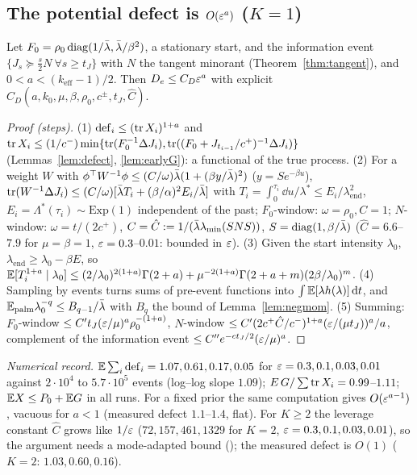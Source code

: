\subsection{The potential defect is $O(\varepsilon^a)$ ($K=1$)}\label{sec:eps-defect}

\begin{proposition}[early-phase defect, $K=1$, $k_0>1$, scaled prior]\label{prop:Dearly}\Ps{}
Let $F_0=\rho_0\operatorname{diag}(1/\bar\lambda,\bar\lambda/\beta^2)$, a stationary start, and the information event $\{J_s\succeq\tfrac s2N\ \forall s\ge t_J\}$ with $N$ the tangent minorant (Theorem~\ref{thm:tangent}), and $0<a<(k_{\mathrm{eff}}-1)/2$. Then $D_e\le C_D\varepsilon^a$ with explicit $C_D(a,k_0,\mu,\beta,\rho_0,c^\pm,t_J,\hat C)$.
\end{proposition}
\begin{proof}[Proof (steps)]
(1) $\mathrm{def}_i\le(\operatorname{tr} X_i)^{1+a}$ and $\operatorname{tr} X_i\le(1/c^-)\min\{\operatorname{tr}(F_0^{-1}\Delta J_i),\operatorname{tr}((F_0+J_{t_{i-1}}/c^+)^{-1}\Delta J_i)\}$ (Lemmas~\ref{lem:defect}, \ref{lem:earlyG}): a functional of the true process. (2) For a weight $W$ with $\phi^{\top} W^{-1}\phi\le(C/\omega)\bar\lambda(1+(\beta y/\bar\lambda)^2)$ ($y=Se^{-\beta u}$), $\operatorname{tr}(W^{-1}\Delta J_i)\le(C/\omega)[\bar\lambda T_i+(\beta/\alpha)^2E_i/\bar\lambda]$ with $T_i=\int_0^{\tau_i}\dd u/\lambda^*\le E_i/\lambda_{\mathrm{end}}^2$, $E_i=\Lambda^*(\tau_i)\sim\mathrm{Exp}(1)$ independent of the past; $F_0$-window: $\omega=\rho_0,C=1$; $N$-window: $\omega=t/(2c^+)$, $C=\hat C:=1/(\bar\lambda\lambda_{\min}(SNS))$, $S=\operatorname{diag}(1,\beta/\bar\lambda)$ ($\hat C=6.6$--$7.9$ for $\mu=\beta=1$, $\varepsilon=0.3$--$0.01$: bounded in $\varepsilon$). (3) Given the start intensity $\lambda_0$, $\lambda_{\mathrm{end}}\ge\lambda_0-\beta E$, so $\mathbb{E}[T_i^{1+a}\mid\lambda_0]\le(2/\lambda_0)^{2(1+a)}\Gamma(2+a)+\mu^{-2(1+a)}\Gamma(2+a+m)(2\beta/\lambda_0)^m$. (4) Sampling by events turns sums of pre-event functions into $\int\mathbb{E}[\lambda h(\lambda)]\,\mathrm d t$, and $\mathbb{E}_{\mathrm{palm}}\lambda_0^{-q}\le B_{q-1}/\bar\lambda$ with $B_q$ the bound of Lemma~\ref{lem:negmom}. (5) Summing: $F_0$-window $\le C't_J(\varepsilon/\mu)^a\rho_0^{-(1+a)}$, $N$-window $\le C'(2c^+\hat C/c^-)^{1+a}(\varepsilon/(\mu t_J))^a/a$, complement of the information event $\le C''e^{-ct_J/2}(\varepsilon/\mu)^a$.
\end{proof}
\emph{Numerical record.} $\mathbb{E}\sum_i\mathrm{def}_i=1.07,0.61,0.17,0.05$ for $\varepsilon=0.3,0.1,0.03,0.01$ against $2\cdot10^4$ to $5.7\cdot10^5$ events (log--log slope $1.09$); $E\,G/\sum\operatorname{tr} X_i=0.99$--$1.11$; $\mathbb{E} X\le P_0+\mathbb{E} G$ in all runs. For a fixed prior the same computation gives $O(\varepsilon^{a-1})$, vacuous for $a<1$ (measured defect $1.1$--$1.4$, flat). For $K\ge2$ the leverage constant $\hat C$ grows like $1/\varepsilon$ ($72,157,461,1329$ for $K=2$, $\varepsilon=0.3,0.1,0.03,0.01$), so the argument needs a mode-adapted bound (\Ot{}); the measured defect is $O(1)$ ($K=2$: $1.03,0.60,0.16$).

